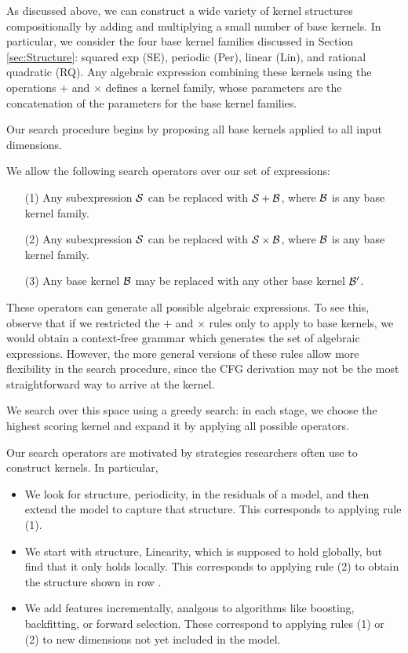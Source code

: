 \documentclass[twoside]{article}
\begin{document}
As discussed above, we can construct a wide variety of kernel structures compositionally by adding and multiplying a small number of base kernels.
In particular, we consider the four base kernel families discussed in Section \ref{sec:Structure}: squared exp (SE), periodic (Per), linear (Lin), and rational quadratic (RQ).
Any algebraic expression combining these kernels using the operations $+$ and $\times$ defines a kernel family, whose parameters are the concatenation of the parameters for the base kernel families. 

Our search procedure begins by proposing all base kernels applied to all input dimensions. 

We allow the following search operators over our set of expressions:
\begin{itemize}
\item[(1)] Any subexpression ${\cal S}$ can be replaced with ${\cal S} + {\cal B}$, where ${\cal B}$ is any base kernel family.
\item[(2)] Any subexpression ${\cal S}$ can be replaced with ${\cal S} \times {\cal B}$, where ${\cal B}$ is any base kernel family.
\item[(3)] Any base kernel ${\cal B}$ may be replaced with any other base kernel ${\cal B}^\prime$.
\end{itemize}

These operators can generate all possible algebraic expressions.
To see this, observe that if we restricted the $+$ and $\times$ rules only to apply to base kernels, we would obtain a context-free grammar which generates the set of algebraic expressions.
However, the more general versions of these rules allow more flexibility in the search procedure, since the CFG derivation may not be the most straightforward way to arrive at the kernel.

We search over this space using a greedy search: in each stage, we choose the highest scoring kernel and expand it by applying all possible operators.

Our search operators are motivated by strategies researchers often use to construct kernels.
In particular,
\begin{itemize}
\item We look for structure, \eg periodicity, in the residuals of a model, and then extend the model to capture that structure.
This corresponds to applying rule (1).
\item We start with structure, \eg Linearity, which is supposed to hold globally, but find that it only holds locally.
This corresponds to applying rule (2) to obtain the structure shown in row .
\item We add features incrementally, analgous to algorithms like boosting, backfitting, or forward selection.
These correspond to applying rules (1) or (2) to new dimensions not yet included in the model.
\end{itemize}
\end{document}
